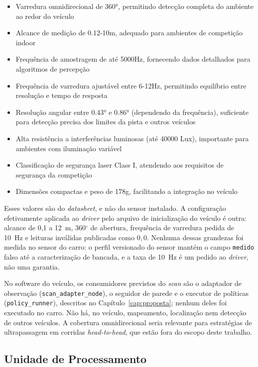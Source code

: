\begin{itemize}
      \item Varredura omnidirecional de 360°, permitindo detecção completa do ambiente ao
            redor do veículo
      \item Alcance de medição de 0.12-10m, adequado para ambientes de competição indoor
      \item Frequência de amostragem de até 5000Hz, fornecendo dados detalhados para
            algoritmos de percepção
      \item Frequência de varredura ajustável entre 6-12Hz, permitindo equilíbrio entre
            resolução e tempo de resposta
      \item Resolução angular entre 0.43° e 0.86° (dependendo da frequência), suficiente
            para detecção precisa dos limites da pista e outros veículos
      \item Alta resistência a interferências luminosas (até 40000 Lux), importante para
            ambientes com iluminação variável
      \item Classificação de segurança laser Class I, atendendo aos requisitos de segurança
            da competição
      \item Dimensões compactas e peso de 178g, facilitando a integração no veículo
\end{itemize}

Esses valores são do \textit{datasheet}, e não do sensor instalado. A
configuração efetivamente aplicada ao \textit{driver} pelo arquivo de
inicialização do veículo é outra: alcance de 0,1 a 12~m, 360$^\circ$ de
abertura, frequência de varredura pedida de 10~Hz e leituras inválidas
publicadas como $0{,}0$. Nenhuma dessas grandezas foi medida no sensor do
carro: o perfil versionado do sensor mantém o campo \texttt{medido} falso até
a caracterização de bancada, e a taxa de 10~Hz é um pedido ao \textit{driver},
não uma garantia.

No software do veículo, os consumidores previstos do \textit{scan} são o
adaptador de observação (\texttt{scan\_adapter\_node}), o seguidor de parede e o
executor de políticas (\texttt{policy\_runner}), descritos no
Capítulo~\ref{cap:proposta}; nenhum deles foi executado no carro. Não há, no
veículo, mapeamento, localização nem detecção de outros veículos. A cobertura
omnidirecional seria relevante para estratégias de ultrapassagem em corridas
\textit{head-to-head}, que estão fora do escopo deste trabalho.

\subsection{Unidade de Processamento}

